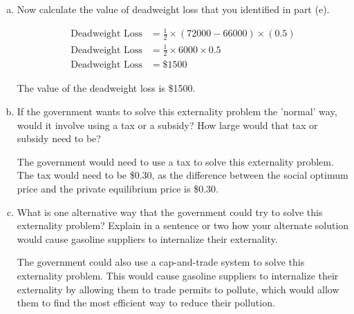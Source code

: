 \documentclass{article}
\begin{document}
\begin{enumerate}[(a)]

    \item Now calculate the value of deadweight loss that you identified in part (e).
    
    \begin{align*}
        \text{Deadweight Loss} &= \frac{1}{2} \times (72000 - 66000) \times (0.5)\\
        \text{Deadweight Loss} &= \frac{1}{2} \times 6000 \times 0.5\\
        \text{Deadweight Loss} &= \$1500
    \end{align*}

    The value of the deadweight loss is \$1500.

    \item If the government wants to solve this externality problem the 'normal' way, would it involve using a tax or a subsidy? How large would that tax or subsidy need to be?
    
    The government would need to use a tax to solve this externality problem. The tax would need to be \$0.30, as the difference between the social optimum price and the private equilibrium price is \$0.30.

    \item What is one alternative way that the government could try to solve this externality problem? Explain in a sentence or two how your alternate solution would cause gasoline suppliers to internalize their externality.
    
    The government could also use a cap-and-trade system to solve this externality problem. This would cause gasoline suppliers to internalize their externality by allowing them to trade permits to pollute, which would allow them to find the most efficient way to reduce their pollution.

\end{enumerate}
\end{document}
